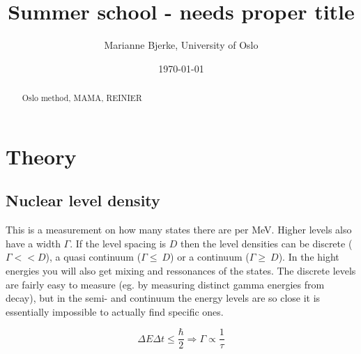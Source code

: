 \documentclass[%
 reprint,
 amsmath,amssymb,
 aps,
 norsk
]{revtex4-1}
\begin{document}
  
        
\title{Summer school - needs proper title}
\author{Marianne Bjerke, University of Oslo}
\date{\today}



\begin{abstract}

Oslo method, MAMA, REINIER


\end{abstract}

\maketitle
\tableofcontents



\section{Theory}

\subsection{Nuclear level density}

This is a measurement on how many states there are per MeV. Higher levels also have a width $\Gamma$. If the level spacing is $D$ then the level densities can be discrete ($\Gamma << D $), a quasi continuum ($\Gamma \leq \ D $) or a continuum ($\Gamma \geq \ D $). In the hight energies you will also get mixing and ressonances of the states. The discrete levels are  fairly easy to measure (eg. by measuring distinct gamma energies from decay), but in the semi- and continuum the energy levels are so close it is essentially impossible to actually find specific ones. 

\begin{equation}
\Delta E \Delta t \leq \frac{\hbar}{2} \Rightarrow \Gamma \propto \frac{1}{\tau}
\end{equation}
\end{document}
